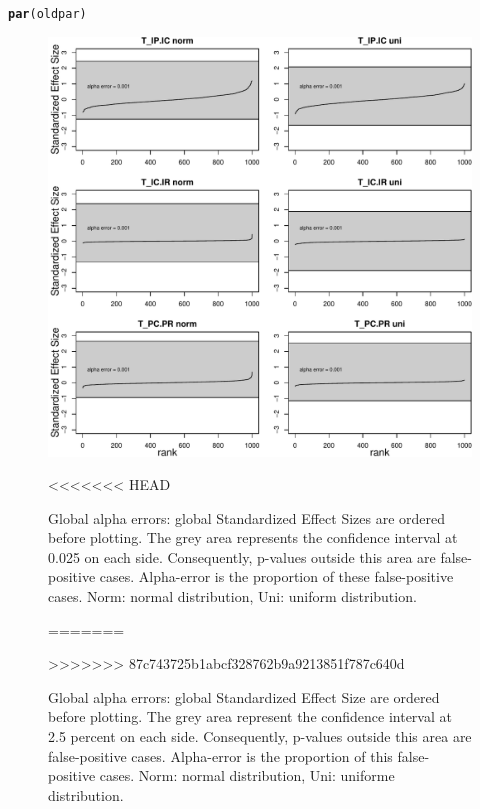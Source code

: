 \documentclass[12pt]{article}\usepackage[]{graphicx}\usepackage[]{color}
\makeatletter
\def\maxwidth{ %
  \ifdim\Gin@nat@width>\linewidth
    \linewidth
  \else
    \Gin@nat@width
  \fi
}
\newcommand{\hlstd}[1]{\textcolor[rgb]{0.345,0.345,0.345}{#1}}%
\newcommand{\hlkwd}[1]{\textcolor[rgb]{0.737,0.353,0.396}{\textbf{#1}}}%
\newenvironment{kframe}{%
 \def\at@end@of@kframe{}%
 \ifinner\ifhmode%
  \def\at@end@of@kframe{\end{minipage}}%
  \begin{minipage}{\columnwidth}%
 \fi\fi%
 \def\FrameCommand##1{\hskip\@totalleftmargin \hskip-\fboxsep
 \colorbox{shadecolor}{##1}\hskip-\fboxsep
     \hskip-\linewidth \hskip-\@totalleftmargin \hskip\columnwidth}%
 \MakeFramed {\advance\hsize-\width
   \@totalleftmargin\z@ \linewidth\hsize
   \@setminipage}}%
 {\par\unskip\endMakeFramed%
 \at@end@of@kframe}
\newenvironment{knitrout}{}{} %
\makeatother
\begin{document}
\begin{landscape}
\begin{knitrout}
\begin{kframe}
\begin{alltt}
\hlkwd{par}\hlstd{(oldpar)}
\end{alltt}
\end{kframe}\begin{figure}

{\centering \includegraphics[width=\maxwidth]{figure/No_filter_summary_plot-1} 

}

<<<<<<< HEAD
\caption[Global alpha errors]{Global alpha errors: global Standardized Effect Sizes are ordered before plotting. The grey area represents the confidence interval at 0.025 on each side. Consequently, p-values outside this area are false-positive cases. Alpha-error is the proportion of these false-positive cases. Norm: normal distribution, Uni: uniform distribution.}\label{fig:No_filter_summary_plot}
=======
\caption[Global alpha errors]{Global alpha errors: global Standardized Effect Size are ordered before plotting. The grey area represent the confidence interval at 2.5 percent on each side. Consequently, p-values outside this area are false-positive cases. Alpha-error is the proportion of this false-positive cases. Norm: normal distribution, Uni: uniforme distribution.}\label{fig:No_filter_summary_plot}
>>>>>>> 87c743725b1abcf328762b9a9213851f787c640d
\end{figure}


\end{knitrout}


\end{landscape}
\end{document}
